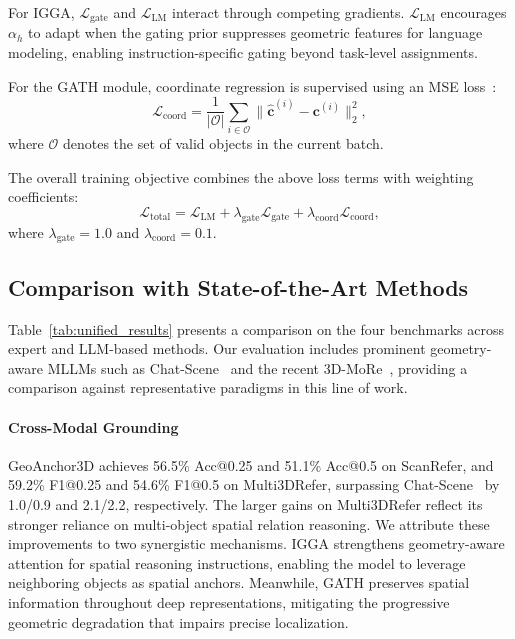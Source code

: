 \documentclass[lettersize,journal]{IEEEtran}
\begin{document}
For IGGA, $\mathcal{L}_{\text{gate}}$ and $\mathcal{L}_{\text{LM}}$ interact through competing gradients. $\mathcal{L}_{\text{LM}}$ encourages $\alpha_h$ to adapt when the gating prior suppresses geometric features for language modeling, enabling instruction-specific gating beyond task-level assignments.

For the GATH module, coordinate regression is supervised using an {MSE} loss~\cite{mseloss}:
\begin{equation}
\mathcal{L}_{\text{coord}} = \frac{1}{|\mathcal{O}|} \sum_{i \in \mathcal{O}} \|\hat{\mathbf{c}}^{(i)} - \mathbf{c}^{(i)}\|_2^2,
\end{equation}
where $\mathcal{O}$ denotes {the set of} valid objects in the current batch.

The overall training objective combines the above loss terms with weighting coefficients:
\begin{equation}
\mathcal{L}_{\text{total}} = \mathcal{L}_{\text{LM}} + \lambda_{\text{gate}} \mathcal{L}_{\text{gate}} + \lambda_{\text{coord}} \mathcal{L}_{\text{coord}},
\end{equation}
where $\lambda_{\text{gate}}=1.0$ and $\lambda_{\text{coord}}=0.1$. 

\subsection{Comparison with State-of-the-Art Methods}

Table~\ref{tab:unified_results} presents a comparison on the four benchmarks across expert and LLM-based methods. Our evaluation includes prominent geometry-aware MLLMs such as Chat-Scene~\cite{chatscene2024} and the recent 3D-MoRe~\cite{3D-MoRe2025}, providing a comparison against representative paradigms in this line of work.

\paragraph*{{Cross-Modal} Grounding} GeoAnchor3D achieves 56.5\% Acc@0.25 and 51.1\% Acc@0.5 on ScanRefer, and 59.2\% F1@0.25 and 54.6\% F1@0.5 on Multi3DRefer, surpassing Chat-Scene~\cite{chatscene2024} by 1.0/0.9 and 2.1/2.2, respectively. The larger gains on Multi3DRefer reflect its stronger reliance on multi-object spatial relation reasoning. We attribute these improvements to two synergistic mechanisms. IGGA strengthens geometry-aware attention for spatial reasoning instructions, enabling the model to leverage neighboring objects as spatial anchors. Meanwhile, GATH preserves spatial information throughout deep representations, mitigating the progressive geometric degradation that impairs precise localization.
\end{document}
